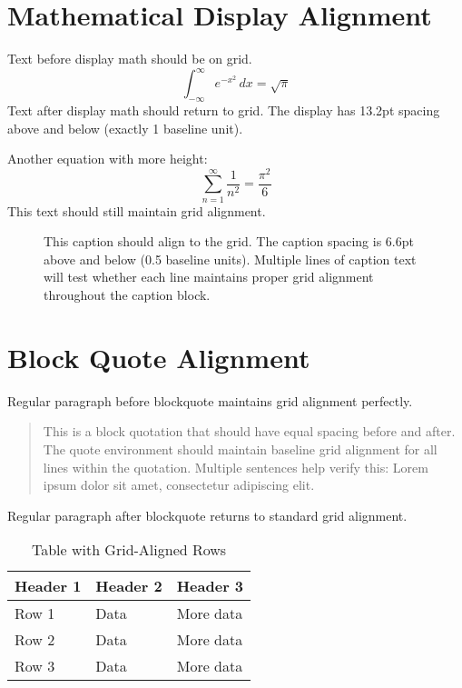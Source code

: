 \documentclass[11pt]{article}
\begin{document}

\section{Mathematical Display Alignment}

Text before display math should be on grid.
\[
\int_{-\infty}^{\infty} e^{-x^2} \, dx = \sqrt{\pi}
\]
Text after display math should return to grid. The display has 13.2pt spacing above and below (exactly 1 baseline unit).

Another equation with more height:
\[
\sum_{n=1}^{\infty} \frac{1}{n^2} = \frac{\pi^2}{6}
\]
This text should still maintain grid alignment.


\begin{figure}[h!]
\centering
{}
\caption{This caption should align to the grid. The caption spacing is 6.6pt above and below (0.5 baseline units). Multiple lines of caption text will test whether each line maintains proper grid alignment throughout the caption block.}
\end{figure}


\section{Block Quote Alignment}

Regular paragraph before blockquote maintains grid alignment perfectly.

\begin{quote}
This is a block quotation that should have equal spacing before and after. The quote environment should maintain baseline grid alignment for all lines within the quotation. Multiple sentences help verify this: Lorem ipsum dolor sit amet, consectetur adipiscing elit.
\end{quote}

Regular paragraph after blockquote returns to standard grid alignment.


\begin{table}[h!]
\caption{Table with Grid-Aligned Rows}
\centering
\begin{tabular}{@{}lll@{}}
\toprule
Header 1 & Header 2 & Header 3 \\
\midrule
Row 1 & Data & More data \\
Row 2 & Data & More data \\
Row 3 & Data & More data \\
\bottomrule
\end{tabular}
\end{table}
\end{document}
